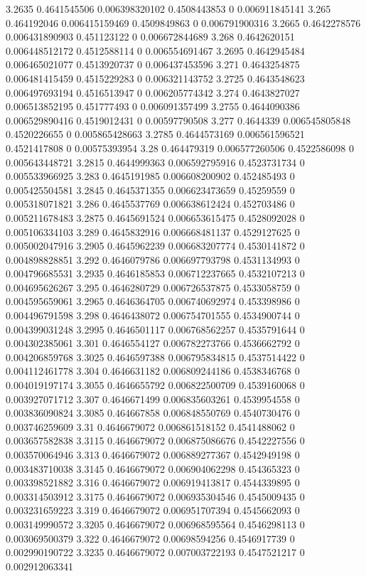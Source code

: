 {3.2635 0.4641545506 0.006398320102 0.4508443853 0 0.006911845141
3.265 0.464192046 0.006415159469 0.4509849863 0 0.006791900316
3.2665 0.4642278576 0.006431890903 0.451123122 0 0.006672844689
3.268 0.4642620151 0.006448512172 0.4512588114 0 0.006554691467
3.2695 0.4642945484 0.006465021077 0.4513920737 0 0.006437453596
3.271 0.4643254875 0.006481415459 0.4515229283 0 0.006321143752
3.2725 0.4643548623 0.006497693194 0.4516513947 0 0.006205774342
3.274 0.4643827027 0.006513852195 0.451777493 0 0.006091357499
3.2755 0.4644090386 0.006529890416 0.4519012431 0 0.00597790508
3.277 0.4644339 0.006545805848 0.4520226655 0 0.005865428663
3.2785 0.4644573169 0.006561596521 0.4521417808 0 0.00575393954
3.28 0.464479319 0.006577260506 0.4522586098 0 0.005643448721
3.2815 0.4644999363 0.006592795916 0.4523731734 0 0.005533966925
3.283 0.4645191985 0.006608200902 0.452485493 0 0.005425504581
3.2845 0.4645371355 0.006623473659 0.45259559 0 0.005318071821
3.286 0.4645537769 0.006638612424 0.452703486 0 0.005211678483
3.2875 0.4645691524 0.006653615475 0.4528092028 0 0.005106334103
3.289 0.4645832916 0.006668481137 0.4529127625 0 0.005002047916
3.2905 0.4645962239 0.006683207774 0.4530141872 0 0.004898828851
3.292 0.4646079786 0.006697793798 0.4531134993 0 0.004796685531
3.2935 0.4646185853 0.006712237665 0.4532107213 0 0.004695626267
3.295 0.4646280729 0.006726537875 0.4533058759 0 0.004595659061
3.2965 0.4646364705 0.006740692974 0.453398986 0 0.004496791598
3.298 0.4646438072 0.006754701555 0.4534900744 0 0.004399031248
3.2995 0.4646501117 0.006768562257 0.4535791644 0 0.004302385061
3.301 0.4646554127 0.006782273766 0.4536662792 0 0.004206859768
3.3025 0.4646597388 0.006795834815 0.4537514422 0 0.004112461778
3.304 0.4646631182 0.006809244186 0.4538346768 0 0.004019197174
3.3055 0.4646655792 0.006822500709 0.4539160068 0 0.003927071712
3.307 0.4646671499 0.006835603261 0.4539954558 0 0.003836090824
3.3085 0.464667858 0.006848550769 0.4540730476 0 0.003746259609
3.31 0.4646679072 0.006861518152 0.4541488062 0 0.003657582838
3.3115 0.4646679072 0.006875086676 0.4542227556 0 0.003570064946
3.313 0.4646679072 0.006889277367 0.4542949198 0 0.003483710038
3.3145 0.4646679072 0.006904062298 0.454365323 0 0.003398521882
3.316 0.4646679072 0.006919413817 0.4544339895 0 0.003314503912
3.3175 0.4646679072 0.006935304546 0.4545009435 0 0.003231659223
3.319 0.4646679072 0.006951707394 0.4545662093 0 0.003149990572
3.3205 0.4646679072 0.006968595564 0.4546298113 0 0.003069500379
3.322 0.4646679072 0.00698594256 0.4546917739 0 0.002990190722
3.3235 0.4646679072 0.007003722193 0.4547521217 0 0.002912063341
}
